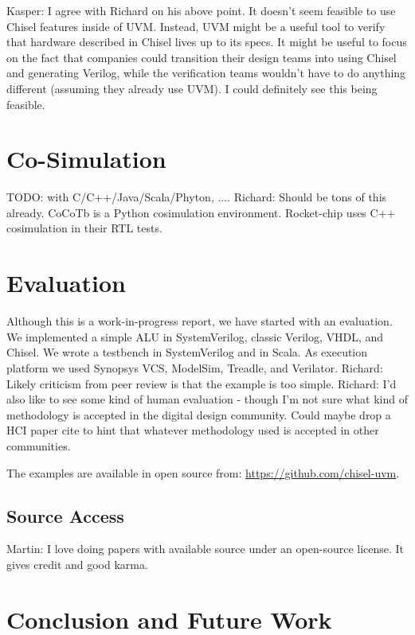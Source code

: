 \documentclass[a4paper, conference]{IEEEtran}
\newcommand{\todo}[1]{{\color{olive} TODO: #1}}
\newcommand{\martin}[1]{{\color{blue} Martin: #1}}
\newcommand{\ducky}[1]{{\color{orange} Richard: #1}}
\newcommand{\kasper}[1]{{\color{purple} Kasper: #1}}
\begin{document}
\kasper{ I agree with Richard on his above point. It doesn't seem feasible to use Chisel features inside of UVM. Instead, UVM might be a useful tool to verify that hardware described in Chisel lives up to its specs. 
It might be useful to focus on the fact that companies could transition their design teams into using Chisel and generating Verilog, while the verification teams wouldn't have to do anything different (assuming they already use UVM). I could definitely see this being feasible. }

\section{Co-Simulation}

\todo{with C/C++/Java/Scala/Phyton, ....}
\ducky{Should be tons of this already. CoCoTb is a Python cosimulation environment. Rocket-chip uses C++ cosimulation in their RTL tests.}

\section{Evaluation}

Although this is a work-in-progress report, we have started with an evaluation.
We implemented a simple ALU in SystemVerilog, classic Verilog, VHDL, and Chisel.
We wrote a testbench in SystemVerilog and in Scala. As execution platform we
used Synopsys VCS, ModelSim, Treadle, and Verilator.
\ducky{Likely criticism from peer review is that the example is too simple.}
\ducky{I'd also like to see some kind of human evaluation - though I'm not sure what kind of methodology is accepted in the digital design community. Could maybe drop a HCI paper cite to hint that whatever methodology used is accepted in other communities.}

The examples are available in open source from: \url{https://github.com/chisel-uvm}.


\subsection{Source Access}

\martin{I love doing papers with available source under an
open-source license. It gives credit and good karma.}


\section{Conclusion and Future Work}
\end{document}
